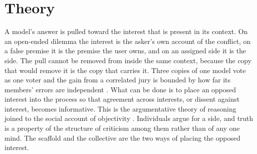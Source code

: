 \section{Theory}
\label{sec-theory}

A model's answer is pulled toward the interest that is present in its
context. On an open-ended dilemma the interest is the asker's own account
of the conflict, on a false premise it is the premise the user owns, and
on an assigned side it is the side. The pull cannot be removed from inside
the same context, because the copy that would remove it is the copy that
carries it. Three copies of one model vote as one voter
and the gain from a correlated jury is bounded by how far its members'
errors are independent
\citep{ladha1992condorcet,boland1989majority,dietrich2013independent,kim2025correlated}.
What can be done is to place an opposed interest into the process so that
agreement across interests, or dissent against interest, becomes
informative. This is the argumentative theory of reasoning
\citep{mercier2011argumentative,mercier2017enigma} joined to the social
account of objectivity \citep{longino1990science,longino2002fate,popper2011open}.
Individuals argue for a side, and truth is a property of the structure of
criticism among them rather than of any one mind. The scaffold and the
collective are the two ways of placing the opposed interest.

